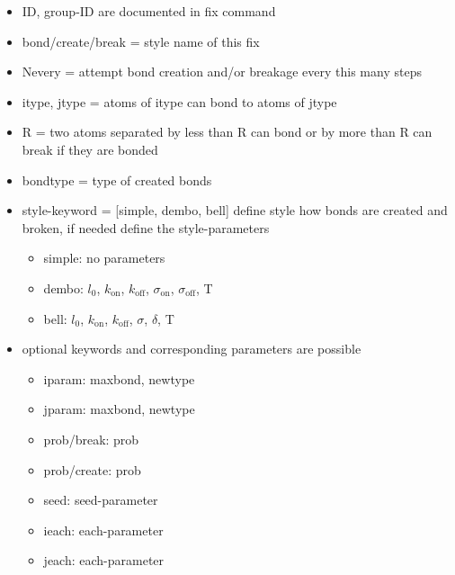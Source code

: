 \begin{itemize}

  \item ID, group-ID are documented in fix command
  \item bond/create/break = style name of this fix
  \item Nevery = attempt bond creation and/or breakage every this many steps
  \item itype, jtype = atoms of itype can bond to atoms of jtype
  \item R = two atoms separated by less than R can bond or by more than R can break if they are bonded
  \item bondtype = type of created bonds
  \item style-keyword =  [simple, dembo, bell] define style how bonds are created and broken, if needed define the style-parameters
  \begin{itemize}
    \item simple: no parameters
    \item dembo: $l_0$, $k_\mathrm{on}$, $k_\mathrm{off}$,  $\sigma_\mathrm{on}$, $\sigma_\mathrm{off}$, T
    \item bell: $l_0$, $k_\mathrm{on}$, $k_\mathrm{off}$,  $\sigma$, $\delta$, T
  \end{itemize}
  \item optional keywords and corresponding parameters are possible
  \begin{itemize}
    \item iparam: maxbond, newtype
    \item jparam: maxbond, newtype
    \item prob/break: prob
    \item prob/create: prob
    \item seed: seed-parameter
    \item ieach: each-parameter
    \item jeach: each-parameter
  \end{itemize}

\end{itemize}

